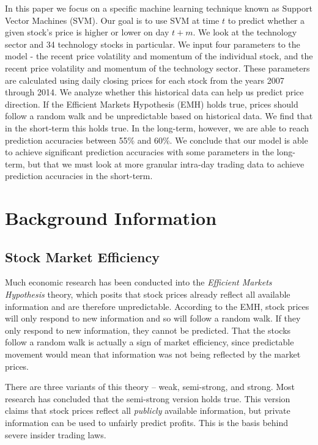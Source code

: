 \documentclass[pageno]{jpaper}
\begin{document}
In this paper we focus on a specific machine learning technique known as Support Vector Machines (SVM). Our goal is to use SVM at time $t$ to predict whether a given stock's price is higher or lower on day $t+m$. We look at the technology sector and 34 technology stocks in particular. We input four parameters to the model - the recent price volatility and momentum of the individual stock, and the recent price volatility and momentum of the technology sector. These parameters are calculated using daily closing prices for each stock from the years 2007 through 2014. We analyze whether this historical data can help us predict price direction. If the Efficient Markets Hypothesis (EMH) holds true, prices should follow a random walk and be unpredictable based on historical data. We find that in the short-term this holds true. In the long-term, however, we are able to reach prediction accuracies between 55\% and 60\%. We conclude that our model is able to achieve significant prediction accuracies with some parameters in the long-term, but that we must look at more granular intra-day trading data to achieve prediction accuracies in the short-term.

\section{Background Information}
\subsection{Stock Market Efficiency}
\label{subsec: stock}
Much economic research has been conducted into the {\em Efficient Markets Hypothesis} theory, which posits that stock prices already reflect all available information \cite{bodie} and are therefore unpredictable. According to the EMH, stock prices will only respond to new information and so will follow a random walk. If they only respond to new information, they cannot be predicted. That the stocks follow a random walk is actually a sign of market efficiency, since predictable movement would mean that information was not being reflected by the market prices.

There are three variants of this theory -- weak, semi-strong, and strong. Most research has concluded that the semi-strong version holds true. This version claims that stock prices reflect all {\em publicly} available information, but private information can be used to unfairly predict profits. This is the basis behind severe insider trading laws.
\end{document}
